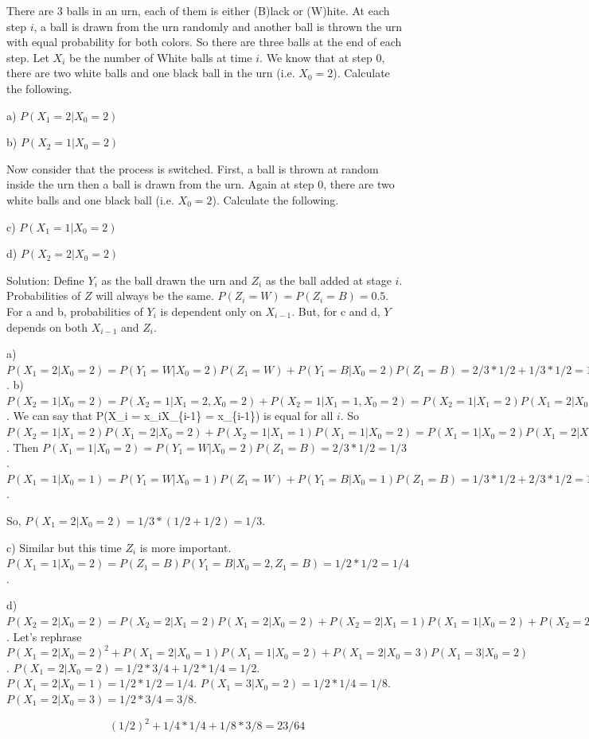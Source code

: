 \documentclass[]{book}
\theoremstyle{definition}
\theoremstyle{definition}
\theoremstyle{definition}
\theoremstyle{remark}
\begin{document}
There are 3 balls in an urn, each of them is either (B)lack or (W)hite.
At each step \(i\), a ball is drawn from the urn randomly and another
ball is thrown the urn with equal probability for both colors. So there
are three balls at the end of each step. Let \(X_i\) be the number of
White balls at time \(i\). We know that at step 0, there are two white
balls and one black ball in the urn (i.e. \(X_0 = 2\)). Calculate the
following.

a) \(P(X_1 = 2 | X_0 = 2)\)

b) \(P(X_2 = 1 | X_0 = 2)\)

Now consider that the process is switched. First, a ball is thrown at
random inside the urn then a ball is drawn from the urn. Again at step
0, there are two white balls and one black ball (i.e. \(X_0 = 2\)).
Calculate the following.

c) \(P(X_1 = 1 | X_0 = 2)\)

d) \(P(X_2 = 2 | X_0 = 2)\)

Solution: Define \(Y_i\) as the ball drawn the urn and \(Z_i\) as the
ball added at stage \(i\). Probabilities of \(Z\) will always be the
same. \(P(Z_i=W) = P(Z_i=B) = 0.5\). For a and b, probabilities of
\(Y_i\) is dependent only on \(X_{i-1}\). But, for c and d, \(Y\)
depends on both \(X_{i-1}\) and \(Z_i\).

a)
\(P(X_1 = 2 | X_0 = 2) = P(Y_1 = W|X_0=2)P(Z_1 = W) + P(Y_1 = B|X_0=2)P(Z_1 = B) = 2/3*1/2 + 1/3*1/2 = 1/2\).
b)
\(P(X_2 = 1|X_0=2) = P(X_2 = 1| X_1 = 2, X_0=2) + P(X_2 = 1| X_1 = 1,X_0=2) = P(X_2=1|X_1=2)P(X_1=2|X_0=2) + P(X_2=1|X_1=1)P(X_1=1|X_0=2)\).
We can say that P(X\_i = x\_i\textbar{}X\_\{i-1\} = x\_\{i-1\}) is equal
for all \(i\). So
\(P(X_2=1|X_1=2)P(X_1=2|X_0=2) + P(X_2=1|X_1=1)P(X_1=1|X_0=2) = P(X_1=1|X_0=2)P(X_1=2|X_0=2) + P(X_1=1|X_0=1)P(X_1=1|X_0=2) = P(X_1=1|X_0=2)(P(X_1=2|X_0=2)+P(X_1=1|X_0=1))\).
Then \(P(X_1=1|X_0=2) = P(Y_1=W|X_0=2)P(Z_1=B) = 2/3*1/2 = 1/3\).
\(P(X_1=1|X_0=1) = P(Y_1 = W|X_0=1)P(Z_1 = W) + P(Y_1 = B|X_0=1)P(Z_1 = B) = 1/3*1/2 + 2/3*1/2 = 1/2\).

So, \(P(X_1 = 2 | X_0 = 2) = 1/3*(1/2 + 1/2) = 1/3\).

c) Similar but this time \(Z_i\) is more important.
\(P(X_1 = 1 | X_0 = 2) = P(Z_1 = B)P(Y_1 = B|X_0=2,Z_1=B) = 1/2*1/2=1/4\).

d)
\(P(X_2 = 2 | X_0 = 2) = P(X_2 = 2 | X_1 = 2)P(X_1 = 2 | X_0 = 2) + P(X_2 = 2 | X_1 = 1)P(X_1 = 1 | X_0 = 2) + P(X_2 = 2 | X_1 = 3)P(X_1 = 3 | X_0 = 2)\).
Let's rephrase
\(P(X_1 = 2 | X_0 = 2)^2 + P(X_1 = 2 | X_0 = 1)P(X_1 = 1 | X_0 = 2) + P(X_1 = 2 | X_0 = 3)P(X_1 = 3 | X_0 = 2)\).
\(P(X_1 = 2 | X_0 = 2) = 1/2*3/4 + 1/2*1/4 = 1/2\).
\(P(X_1 = 2|X_0 = 1) = 1/2*1/2 = 1/4\).
\(P(X_1 = 3|X_0 = 2) = 1/2*1/4 = 1/8\).
\(P(X_1 = 2|X_0 = 3) = 1/2*3/4 = 3/8\).

\[(1/2)^2 + 1/4 * 1/4 + 1/8*3/8 = 23/64\]


\end{document}
